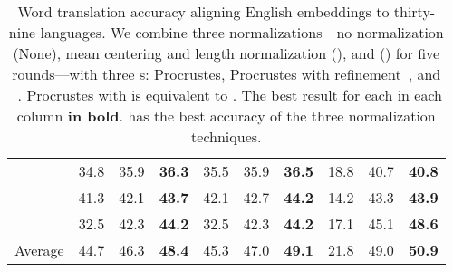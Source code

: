 \begin{table*}[p]
\begin{tabular}{lRRRRRRRRR}
     & 34.8 & 35.9 & \bf{36.3} & 35.5 & 35.9 & \bf{36.5} & 18.8 & 40.7 & \bf{40.8}\\
     & 41.3 & 42.1 & \bf{43.7} & 42.1 & 42.7 & \bf{44.2} & 14.2 & 43.3 & \bf{43.9}\\
     & 32.5 & 42.3 & \bf{44.2} & 32.5 & 42.3 & \bf{44.2} & 17.1 & 45.1 & \bf{48.6}\\
    \midrule
    Average & 44.7 & 46.3 & \bf{48.4} & 45.3 & 47.0 & \bf{49.1} & 21.8 & 49.0 & \bf{50.9}\\
    \bottomrule
  \end{tabular}
  \caption{Word translation accuracy aligning English embeddings to thirty-nine
  languages.
  We combine three normalizations---no normalization (None), mean
  centering and length normalization (), and \name{}
  () for five rounds---with three s: Procrustes, Procrustes
  with refinement~\citep{conneau-18}, and
  ~\citep{joulin-18}.
  Procrustes with  is equivalent to \citet{artetxe-16}.
  The best result for each  in each column \textbf{in
  bold}.  \name{} has the best accuracy of the three normalization techniques.}
  \label{tab:result_all}
\end{table*}
